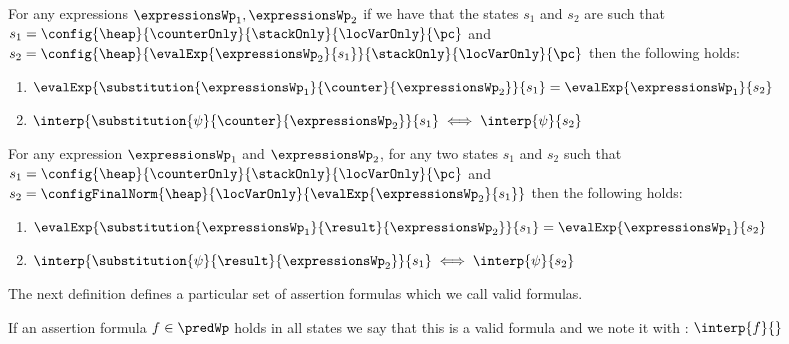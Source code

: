 \begin{substCntr}\label{substCntr}
For any expressions $ \expressionsWp_1, \expressionsWp_2 $ 
if we have that the states $s_1$ and $s_2$ are such that
 $s_1 =   \config{\heap}{\counterOnly}{ \stackOnly }{\locVarOnly}{\pc }$ and 
$s_2 =  \config{\heap}{\evalExp{ \expressionsWp_2}{ s_1  } }{ \stackOnly }{\locVarOnly}{\pc }  $ then 
the following holds:
\begin{enumerate}
      \item $\evalExp{\substitution{\expressionsWp_1}{ \counter }{ \expressionsWp_2 }}{ s_1 } = \evalExp{\expressionsWp_1}{s_2} $
      \item $\interp{\substitution{\psi}{ \counter }{ \expressionsWp_2 }}{ s_1 } \iff \interp{\psi}{s_2} $
\end{enumerate}
\end{substCntr} 




\begin{substRet}\label{substRet} 
For any expression $\expressionsWp_1$ and $\expressionsWp_2$,
for any two states $s_1$ and $s_2$  such that
$ s_1 =   \config{\heap}{\counterOnly}{ \stackOnly }{\locVarOnly}{\pc }$ and \\
$ s_2 =   \configFinalNorm{\heap}{\locVarOnly}{\evalExp{\expressionsWp_2}{s_1} } $ then 
the following holds:
\begin{enumerate}
      \item $\evalExp{\substitution{\expressionsWp_1}{ \result }{ \expressionsWp_2 }}{ s_1 } = \evalExp{\expressionsWp_1}{s_2} $
      \item $\interp{\substitution{\psi}{ \result}{ \expressionsWp_2 }}{ s_1 } \iff \interp{\psi}{s_2} $
\end{enumerate}
\end{substRet}


The next definition defines a particular set of assertion formulas which we call valid formulas.
\begin{valid}
  If an assertion formula  $ f \in \predWp $ holds in all states we say that this is a valid formula and we note it with :
  $ \interp{f}{}$
\end{valid}




